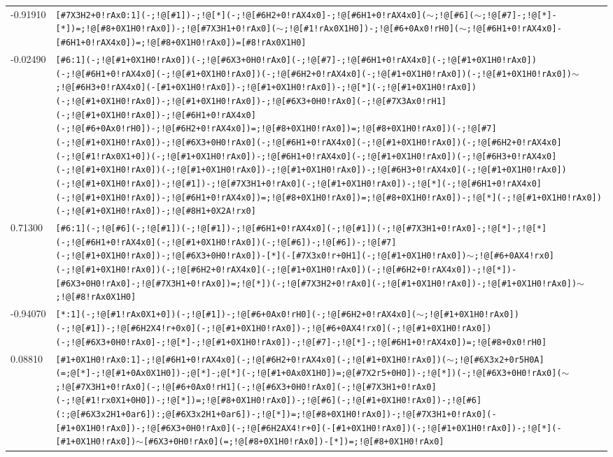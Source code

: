 \begin{longtable}{>{\baselineskip=10pt}p{} >{\baselineskip=10pt}p{}}
-0.91910 & \texttt{[\#7X3H2+0!rAx0:1](-;!@[\#1])-;!@[*](-;!@[\#6H2+0!rAX4x0]-;!@[\#6H1+0!rAX4x0]($\sim$;!@[\#6]($\sim$;!@[\#7]-;!@[*]-[*])=;!@[\#8+0X1H0!rAx0])-;!@[\#7X3H1+0!rAx0]($\sim$;!@[\#1!rAx0X1H0])-;!@[\#6+0Ax0!rH0]($\sim$;!@[\#6H1+0!rAX4x0]-[\#6H1+0!rAX4x0])=;!@[\#8+0X1H0!rAx0])=[\#8!rAx0X1H0]} \\ 
-0.02490 & \texttt{[\#6:1](-;!@[\#1+0X1H0!rAx0])(-;!@[\#6X3+0H0!rAx0](-;!@[\#7]-;!@[\#6H1+0!rAX4x0](-;!@[\#1+0X1H0!rAx0])(-;!@[\#6H1+0!rAX4x0](-;!@[\#1+0X1H0!rAx0])(-;!@[\#6H2+0!rAX4x0](-;!@[\#1+0X1H0!rAx0])(-;!@[\#1+0X1H0!rAx0])$\sim$;!@[\#6H3+0!rAX4x0](-[\#1+0X1H0!rAx0])-;!@[\#1+0X1H0!rAx0])-;!@[*](-;!@[\#1+0X1H0!rAx0])(-;!@[\#1+0X1H0!rAx0])-;!@[\#1+0X1H0!rAx0])-;!@[\#6X3+0H0!rAx0](-;!@[\#7X3Ax0!rH1](-;!@[\#1+0X1H0!rAx0])-;!@[\#6H1+0!rAX4x0](-;!@[\#6+0Ax0!rH0])-;!@[\#6H2+0!rAX4x0])=;!@[\#8+0X1H0!rAx0])=;!@[\#8+0X1H0!rAx0])(-;!@[\#7](-;!@[\#1+0X1H0!rAx0])-;!@[\#6X3+0H0!rAx0](-;!@[\#6H1+0!rAX4x0](-;!@[\#1+0X1H0!rAx0])(-;!@[\#6H2+0!rAX4x0](-;!@[\#1!rAx0X1+0])(-;!@[\#1+0X1H0!rAx0])-;!@[\#6H1+0!rAX4x0](-;!@[\#1+0X1H0!rAx0])(-;!@[\#6H3+0!rAX4x0](-;!@[\#1+0X1H0!rAx0])(-;!@[\#1+0X1H0!rAx0])-;!@[\#1+0X1H0!rAx0])-;!@[\#6H3+0!rAX4x0](-;!@[\#1+0X1H0!rAx0])(-;!@[\#1+0X1H0!rAx0])-;!@[\#1])-;!@[\#7X3H1+0!rAx0](-;!@[\#1+0X1H0!rAx0])-;!@[*](-;!@[\#6H1+0!rAX4x0](-;!@[\#1+0X1H0!rAx0])-;!@[\#6H1+0!rAX4x0])=;!@[\#8+0X1H0!rAx0])=;!@[\#8+0X1H0!rAx0])-;!@[*](-;!@[\#1+0X1H0!rAx0])(-;!@[\#1+0X1H0!rAx0])-;!@[\#8H1+0X2A!rx0]} \\ 
0.71300 & \texttt{[\#6:1](-;!@[\#6](-;!@[\#1])(-;!@[\#1])-;!@[\#6H1+0!rAX4x0](-;!@[\#1])(-;!@[\#7X3H1+0!rAx0]-;!@[*]-;!@[*](-;!@[\#6H1+0!rAX4x0](-;!@[\#1+0X1H0!rAx0])(-;!@[\#6])-;!@[\#6])-;!@[\#7](-;!@[\#1+0X1H0!rAx0])-;!@[\#6X3+0H0!rAx0])-[*](-[\#7X3x0!r+0H1](-;!@[\#1+0X1H0!rAx0])$\sim$;!@[\#6+0AX4!rx0](-;!@[\#1+0X1H0!rAx0])(-;!@[\#6H2+0!rAX4x0](-;!@[\#1+0X1H0!rAx0])(-;!@[\#6H2+0!rAX4x0])-;!@[*])-[\#6X3+0H0!rAx0]-;!@[\#7X3H1+0!rAx0])=;!@[*])(-;!@[\#7X3H2+0!rAx0](-;!@[\#1+0X1H0!rAx0])-;!@[\#1+0X1H0!rAx0])$\sim$;!@[\#8!rAx0X1H0]} \\ 
-0.94070 & \texttt{[*:1](-;!@[\#1!rAx0X1+0])(-;!@[\#1])-;!@[\#6+0Ax0!rH0](-;!@[\#6H2+0!rAX4x0]($\sim$;!@[\#1+0X1H0!rAx0])(-;!@[\#1])-;!@[\#6H2X4!r+0x0](-;!@[\#1+0X1H0!rAx0])-;!@[\#6+0AX4!rx0](-;!@[\#1+0X1H0!rAx0])(-;!@[\#6X3+0H0!rAx0]-;!@[*]-;!@[\#1+0X1H0!rAx0])-;!@[\#7]-;!@[*]-;!@[\#6H1+0!rAX4x0])=;!@[\#8+0x0!rH0]} \\ 
0.08810 & \texttt{[\#1+0X1H0!rAx0:1]-;!@[\#6H1+0!rAX4x0](-;!@[\#6H2+0!rAX4x0](-;!@[\#1+0X1H0!rAx0])($\sim$;!@[\#6X3x2+0r5H0A](=;@[*]-;!@[\#1+0Ax0X1H0])-;@[*]-;@[*](-;!@[\#1+0Ax0X1H0])=;@[\#7X2r5+0H0])-;!@[*])(-;!@[\#6X3+0H0!rAx0]($\sim$;!@[\#7X3H1+0!rAx0](-;!@[\#6+0Ax0!rH1](-;!@[\#6X3+0H0!rAx0](-;!@[\#7X3H1+0!rAx0](-;!@[\#1!rx0X1+0H0])-;!@[*])=;!@[\#8+0X1H0!rAx0])-;!@[\#6](-;!@[\#1+0X1H0!rAx0])-;!@[\#6](:;@[\#6X3x2H1+0ar6]):;@[\#6X3x2H1+0ar6])-;!@[*])=;!@[\#8+0X1H0!rAx0])-;!@[\#7X3H1+0!rAx0](-[\#1+0X1H0!rAx0])-;!@[\#6X3+0H0!rAx0](-;!@[\#6H2AX4!r+0](-[\#1+0X1H0!rAx0])(-;!@[\#1+0X1H0!rAx0])-;!@[*](-[\#1+0X1H0!rAx0])$\sim$[\#6X3+0H0!rAx0](=;!@[\#8+0X1H0!rAx0])-[*])=;!@[\#8+0X1H0!rAx0]} \\ 

\end{longtable}
